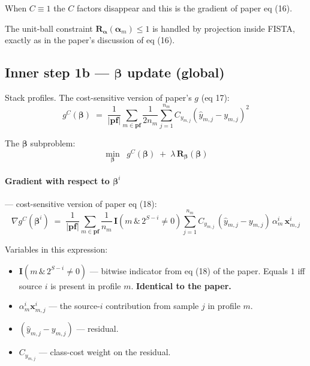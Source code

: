 \documentclass[11pt,a4paper]{article}
\begin{document}
When $C \equiv 1$ the $C$ factors disappear and this is the gradient of paper eq (16). \checkmark

The unit-ball constraint $\mathbf{R}_{\boldsymbol{\alpha}}(\boldsymbol{\alpha}_m) \leq 1$ is handled by projection inside FISTA, exactly as in the paper's discussion of eq (16).

\subsection{Inner step 1b --- $\boldsymbol{\beta}$ update (global)}

Stack profiles. The cost-sensitive version of paper's $g$ (eq 17):
\[
g^{C}(\boldsymbol{\beta}) \;=\; \frac{1}{|\mathbf{pf}|}\sum_{m \in \mathbf{pf}}\frac{1}{2 n_m}\sum_{j=1}^{n_m} C_{y_{m,j}}\!\left(\hat{y}_{m,j} - y_{m,j}\right)^{2}
\]

The $\boldsymbol{\beta}$ subproblem:
\begin{equation}
\boxed{\;\min_{\boldsymbol{\beta}}\;\;g^{C}(\boldsymbol{\beta}) \;+\; \lambda\,\mathbf{R}_{\boldsymbol{\beta}}(\boldsymbol{\beta})\;}
\end{equation}

\paragraph{Gradient with respect to $\boldsymbol{\beta}^i$} --- cost-sensitive version of paper eq (18):
\begin{equation}
\boxed{\;\nabla g^{C}(\boldsymbol{\beta}^{i}) \;=\; \frac{1}{|\mathbf{pf}|}\sum_{m \in \mathbf{pf}}\frac{1}{n_m}\,\mathbf{I}\!\left(m\,\&\,2^{S-i}\neq 0\right)\sum_{j=1}^{n_m} C_{y_{m,j}}\,(\hat{y}_{m,j} - y_{m,j})\,\alpha^{i}_{m}\,\mathbf{x}^{i}_{m,j}\;}
\end{equation}

Variables in this expression:
\begin{itemize}[leftmargin=*,itemsep=2pt]
  \item $\mathbf{I}(m \,\&\, 2^{S-i} \neq 0)$ --- bitwise indicator from eq (18) of the paper. Equals $1$ iff source $i$ is present in profile $m$. \textbf{Identical to the paper.}
  \item $\alpha^i_m \mathbf{x}^i_{m,j}$ --- the source-$i$ contribution from sample $j$ in profile $m$.
  \item $(\hat{y}_{m,j} - y_{m,j})$ --- residual.
  \item $C_{y_{m,j}}$ --- class-cost weight on the residual.
\end{itemize}
\end{document}
